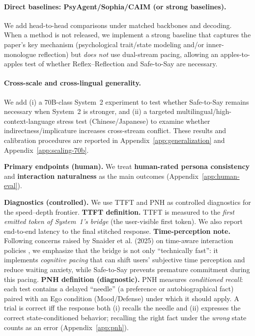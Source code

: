 \documentclass{article}
\begin{document}
\paragraph{Direct baselines: PsyAgent/Sophia/CAIM (or strong baselines).}
We add head-to-head comparisons under matched backbones and decoding.
When a method is not released, we implement a strong baseline that captures the paper's key mechanism (psychological trait/state modeling and/or inner-monologue reflection) but \emph{does not} use dual-stream pacing, allowing an apples-to-apples test of whether Reflex--Reflection and Safe-to-Say are necessary.

\paragraph{Cross-scale and cross-lingual generality.}
We add (i) a 70B-class System~2 experiment to test whether Safe-to-Say remains necessary when System~2 is stronger, and (ii) a targeted multilingual/high-context-language stress test (Chinese/Japanese) to examine whether indirectness/implicature increases cross-stream conflict.
These results and calibration procedures are reported in Appendix~\ref{app:generalization} and Appendix~\ref{app:scaling-70b}.

\textbf{Primary endpoints (human).}
We treat \textbf{human-rated persona consistency} and \textbf{interaction naturalness} as the main outcomes (Appendix~\ref{app:human-eval}).

\textbf{Diagnostics (controlled).}
We use TTFT and PNH as controlled diagnostics for the speed--depth frontier.
\textbf{TTFT definition.} TTFT is measured to the \emph{first emitted token of System~1's bridge} (the user-visible first token). We also report end-to-end latency to the final stitched response.
\textbf{Time-perception note.} Following concerns raised by Snaider et al. (2025) on time-aware interaction policies \cite{snaider2025timeperception}, we emphasize that the bridge is not only ``technically fast'': it implements \emph{cognitive pacing} that can shift users' subjective time perception and reduce waiting anxiety, while Safe-to-Say prevents premature commitment during this pacing.
\textbf{PNH definition (diagnostic).} PNH measures \emph{conditioned recall}: each test contains a delayed ``needle'' (a preference or autobiographical fact) paired with an Ego condition (Mood/Defense) under which it should apply. A trial is correct iff the response both (i) recalls the needle and (ii) expresses the correct state-conditioned behavior; recalling the right fact under the \emph{wrong} state counts as an error (Appendix~\ref{app:pnh}).
\end{document}
